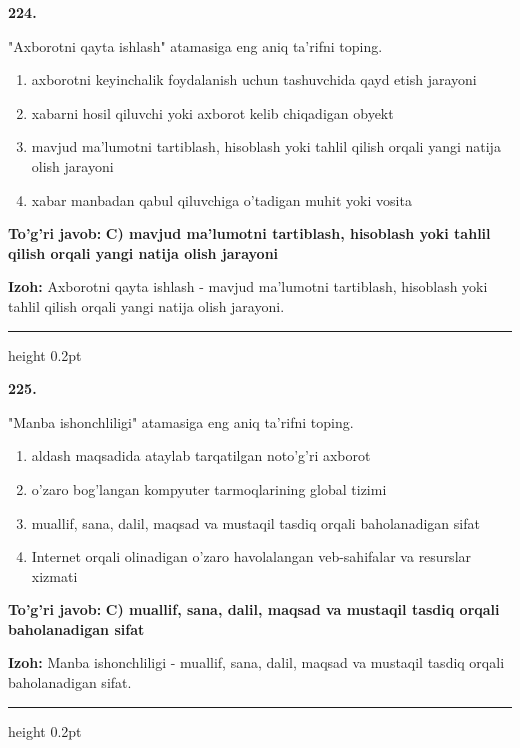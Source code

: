 \documentclass[10pt,a4paper,oneside]{article}
\begin{document}
\noindent\textbf{\color{ink}224.}
\par
"Axborotni qayta ishlash" atamasiga eng aniq ta'rifni toping.
\begin{enumerate}[label=\Alph*),leftmargin=9mm]
\item axborotni keyinchalik foydalanish uchun tashuvchida qayd etish jarayoni
\item xabarni hosil qiluvchi yoki axborot kelib chiqadigan obyekt
\item mavjud ma'lumotni tartiblash, hisoblash yoki tahlil qilish orqali yangi natija olish jarayoni
\item xabar manbadan qabul qiluvchiga o'tadigan muhit yoki vosita
\end{enumerate}
\begin{tcolorbox}[enhanced,breakable,colback=teal!4,colframe=teal!50!black,boxrule=0.5pt,arc=1.1mm,left=3mm,right=3mm,top=1.7mm,bottom=1.7mm,before skip=2mm,after skip=2mm]
\textbf{\color{teal}To'g'ri javob:} \textbf{C) mavjud ma'lumotni tartiblash, hisoblash yoki tahlil qilish orqali yangi natija olish jarayoni}
\par\smallskip
\textbf{Izoh:} Axborotni qayta ishlash - mavjud ma'lumotni tartiblash, hisoblash yoki tahlil qilish orqali yangi natija olish jarayoni.
\end{tcolorbox}
\vspace{2mm}\hrule height 0.2pt \vspace{3mm}

\noindent\textbf{\color{ink}225.}
\par
"Manba ishonchliligi" atamasiga eng aniq ta'rifni toping.
\begin{enumerate}[label=\Alph*),leftmargin=9mm]
\item aldash maqsadida ataylab tarqatilgan noto'g'ri axborot
\item o'zaro bog'langan kompyuter tarmoqlarining global tizimi
\item muallif, sana, dalil, maqsad va mustaqil tasdiq orqali baholanadigan sifat
\item Internet orqali olinadigan o'zaro havolalangan veb-sahifalar va resurslar xizmati
\end{enumerate}
\begin{tcolorbox}[enhanced,breakable,colback=teal!4,colframe=teal!50!black,boxrule=0.5pt,arc=1.1mm,left=3mm,right=3mm,top=1.7mm,bottom=1.7mm,before skip=2mm,after skip=2mm]
\textbf{\color{teal}To'g'ri javob:} \textbf{C) muallif, sana, dalil, maqsad va mustaqil tasdiq orqali baholanadigan sifat}
\par\smallskip
\textbf{Izoh:} Manba ishonchliligi - muallif, sana, dalil, maqsad va mustaqil tasdiq orqali baholanadigan sifat.
\end{tcolorbox}
\vspace{2mm}\hrule height 0.2pt \vspace{3mm}
\end{document}
